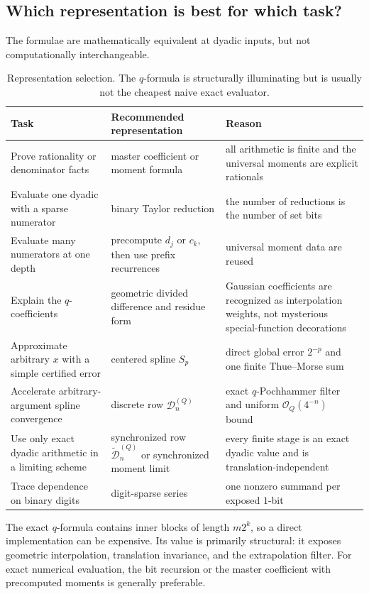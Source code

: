 \documentclass[11pt,oneside]{article}
\theoremstyle{definition}
\theoremstyle{remark}
\newcommand{\bigO}{\mathcal O}
\begin{document}
\subsection{Which representation is best for which task?}

The formulae are mathematically equivalent at dyadic inputs, but not computationally
interchangeable.

\begin{table}[ht]
\centering
\small
\begin{tabularx}{\textwidth}{@{}p{}p{}X@{}}
\toprule
Task & Recommended representation & Reason \\
\midrule
Prove rationality or denominator facts & master coefficient or moment formula & all arithmetic is finite and the universal moments are explicit rationals \\
Evaluate one dyadic with a sparse numerator & binary Taylor reduction & the number of reductions is the number of set bits \\
Evaluate many numerators at one depth & precompute $d_j$ or $c_k$, then use prefix recurrences & universal moment data are reused \\
Explain the $q$-coefficients & geometric divided difference and residue form & Gaussian coefficients are recognized as interpolation weights, not mysterious special-function decorations \\
Approximate arbitrary $x$ with a simple certified error & centered spline $S_p$ & direct global error $2^{-p}$ and one finite Thue--Morse sum \\
Accelerate arbitrary-argument spline convergence & discrete row $\mathcal D_n^{(Q)}$ & exact $q$-Pochhammer filter and uniform $\bigO_Q(4^{-n})$ bound \\
Use only exact dyadic arithmetic in a limiting scheme & synchronized row $\widetilde{\mathcal D}_n^{(Q)}$ or synchronized moment limit & every finite stage is an exact dyadic value and is translation-independent \\
Trace dependence on binary digits & digit-sparse series & one nonzero summand per exposed $1$-bit \\
\bottomrule
\end{tabularx}
\caption{Representation selection.  The $q$-formula is structurally illuminating but is
usually not the cheapest naive exact evaluator.}
\label{tab:representation-selection}
\end{table}

The exact $q$-formula contains inner blocks of length $m2^k$, so a direct implementation can
be expensive.  Its value is primarily structural: it exposes geometric interpolation,
translation invariance, and the extrapolation filter.  For exact numerical evaluation, the
bit recursion or the master coefficient with precomputed moments is generally preferable.
\end{document}
